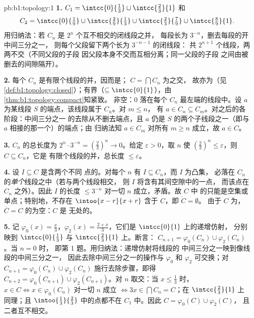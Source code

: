 \begin{solution}{pb:b1:topology:1}
\textbf{1.} $C_1 = \intcc{0}{\frac13} \cup \intcc{\frac23}{1}$
和
\[
C_2 = \intcc{0}{\tfrac19} \cup \intcc{\tfrac29}{\tfrac13}
\cup \intcc{\tfrac23}{\tfrac79} \cup \intcc{\tfrac89}{1} .
\]
用归纳法：若 $C_n$ 是 $2^n$ 个互不相交的闭线段之并，
每段长为 $3^{-n}$，删去每段的开中间三分之一，
则每个父段留下两个长为 $3^{-n-1}$ 的闭线段：
共 $2^{n+1}$ 个线段，两两不交（不同父段的子段
因父段本身不交而互相分离；同一父段的子段
之间由被删去的间隙隔开）。

\textbf{2.} 每个 $C_n$ 是有限个线段的并，因而是；
$C = \bigcap C_n$ 为之交，
故亦为（见\cref{def:b1:topology:closed}）；有界（$\subseteq
\intcc{0}{1}$），由\cref{thm:b1:topology:compact}知紧致。
非空：$0$ 落在每个 $C_n$ 最左端的线段中。设
$a$ 为某线段 $S$ 的端点，该线段属于 $C_n$。对 $m \leq n$，
有 $a \in C_n \subseteq C_m$。对之后的各阶段：中间三分之一
的去除从不删去端点，且 $a$ 仍是
$S$ 的两个子线段之一（即与 $a$ 相接的那一个）的端点；由
归纳法知 $a \in C_m$ 对所有 $m \geq n$ 成立，故 $a \in C$。

\textbf{3.} $C_n$ 的总长度为 $2^n \cdot 3^{-n} =
(\frac23)^n \to 0$。给定 $\varepsilon > 0$，取 $n$ 使
$(\frac23)^n \leq \varepsilon$，则 $C \subseteq C_n$，它是
有限个线段的并，总长度 $\leq \varepsilon$。

\textbf{4.} 设 $I \subseteq C$ 是含两个不同
点的。对每个 $n$ 有 $I \subseteq C_n$，而 $I$ 为凸集，
必落在 $C_n$ 的\emph{单个}线段之中（若与两个线段相交，
则 $I$ 将含有其间空隙中的一点，
而该点在 $C_n$ 之外）。因此 $I$ 的长度 $\leq
3^{-n}$ 对一切 $n$ 成立，矛盾。故 $C$ 中
的只能是空集或单点；特别地，不存在
$\intoo{x-r}{x+r}$ 含于 $C$，即 $\mathring C = \emptyset$。
由于 $C$ 为，$\overline C = C$ 的为空：$C$ 是
无处的。

\textbf{5.} 记 $\varphi_0(x) = \frac x3$，$\varphi_2(x) =
\frac{2 + x}{3}$，它们是 $\intcc{0}{1}$ 上的递增仿射，
分别映到 $\intcc{0}{\frac13}$ 与 $\intcc{\frac23}{1}$ 上。断言：
$C_{n+1} = \varphi_0(C_n) \cup \varphi_2(C_n)$。当 $n = 0$ 时，
即第 1 题。用归纳法：递增仿射将线段的
中间三分之一映到像线段的中间三分之一，
因此去除中间三分之一的操作与 $\varphi_0$ 和
$\varphi_2$ 可交换；对 $C_{n+1} =
\varphi_0(C_n) \cup \varphi_2(C_n)$ 施行去除步骤，即得 $C_{n+2} =
\varphi_0(C_{n+1}) \cup \varphi_2(C_{n+1})$。对
$n$ 取交：当 $x \leq \frac13$ 时，$x \in C \iff x \in \varphi_0(C_n)$
对一切 $n$ 成立 $\iff 3x \in \bigcap C_n = C$；在
$\intcc{\frac23}{1}$ 上同理；且 $\intoo{\frac13}{\frac23}$
中的点都不在 $C_1$ 中。因此 $C = \varphi_0(C) \cup \varphi_2(C)$，
且二者互不相交。


\end{solution}
